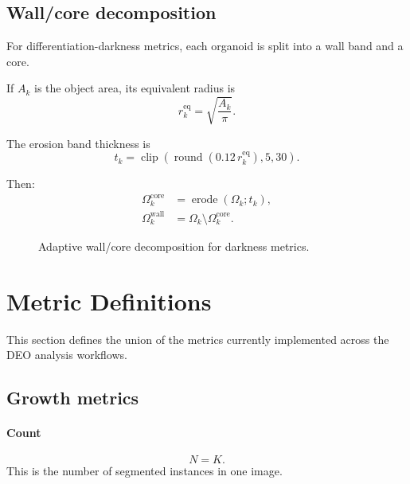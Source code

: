 \documentclass[11pt]{article}
\newcommand{\1}{\mathbf{1}}
\newcommand{\clip}{\operatorname{clip}}
\newcommand{\erode}{\operatorname{erode}}
\begin{document}
\subsection{Wall/core decomposition}
For differentiation-darkness metrics, each organoid is split into a wall band and a core.

If $A_k$ is the object area, its equivalent radius is
\begin{equation}
r_k^{\mathrm{eq}} = \sqrt{\frac{A_k}{\pi}}.
\end{equation}

The erosion band thickness is
\begin{equation}
t_k = \clip\left(\operatorname{round}(0.12\,r_k^{\mathrm{eq}}), 5, 30\right).
\end{equation}

Then:
\begin{align}
\Omega_k^{\mathrm{core}} &= \erode(\Omega_k; t_k),\\
\Omega_k^{\mathrm{wall}} &= \Omega_k \setminus \Omega_k^{\mathrm{core}}.
\end{align}

\begin{figure}[H]
\centering
{}
\caption{Adaptive wall/core decomposition for darkness metrics.}
\end{figure}

\section{Metric Definitions}
This section defines the union of the metrics currently implemented across the DEO analysis workflows.

\subsection{Growth metrics}
\paragraph{Count}
\begin{equation}
N = K.
\end{equation}
This is the number of segmented instances in one image.
\end{document}
